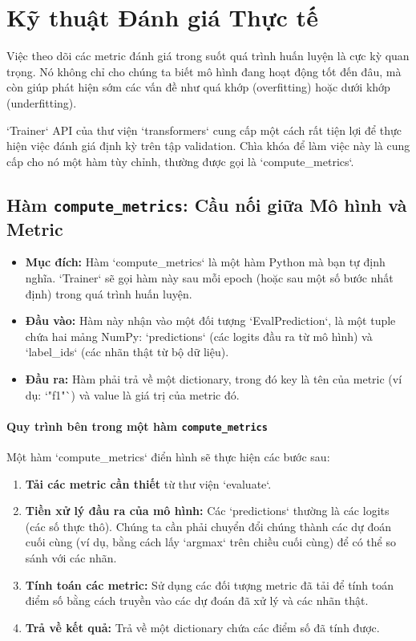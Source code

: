 
\section{Kỹ thuật Đánh giá Thực tế}
\label{sec:practical_evaluation}

Việc theo dõi các metric đánh giá trong suốt quá trình huấn luyện là cực kỳ quan trọng. Nó không chỉ cho chúng ta biết mô hình đang hoạt động tốt đến đâu, mà còn giúp phát hiện sớm các vấn đề như quá khớp (overfitting) hoặc dưới khớp (underfitting).

`Trainer` API của thư viện `transformers` cung cấp một cách rất tiện lợi để thực hiện việc đánh giá định kỳ trên tập validation. Chìa khóa để làm việc này là cung cấp cho nó một hàm tùy chỉnh, thường được gọi là `compute\_metrics`.

\subsection{Hàm \texttt{compute\_metrics}: Cầu nối giữa Mô hình và Metric}
\label{ssec:compute_metrics_function}

\begin{itemize}
    \item \textbf{Mục đích:} Hàm `compute\_metrics` là một hàm Python mà bạn tự định nghĩa. `Trainer` sẽ gọi hàm này sau mỗi epoch (hoặc sau một số bước nhất định) trong quá trình huấn luyện.
    \item \textbf{Đầu vào:} Hàm này nhận vào một đối tượng `EvalPrediction`, là một tuple chứa hai mảng NumPy: `predictions` (các logits đầu ra từ mô hình) và `label\_ids` (các nhãn thật từ bộ dữ liệu).
    \item \textbf{Đầu ra:} Hàm phải trả về một dictionary, trong đó key là tên của metric (ví dụ: `"f1"`) và value là giá trị của metric đó.
\end{itemize}

\paragraph{Quy trình bên trong một hàm \texttt{compute\_metrics}}
Một hàm `compute\_metrics` điển hình sẽ thực hiện các bước sau:
\begin{enumerate}
    \item \textbf{Tải các metric cần thiết} từ thư viện `evaluate`.
    \item \textbf{Tiền xử lý đầu ra của mô hình:} Các `predictions` thường là các logits (các số thực thô). Chúng ta cần phải chuyển đổi chúng thành các dự đoán cuối cùng (ví dụ, bằng cách lấy `argmax` trên chiều cuối cùng) để có thể so sánh với các nhãn.
    \item \textbf{Tính toán các metric:} Sử dụng các đối tượng metric đã tải để tính toán điểm số bằng cách truyền vào các dự đoán đã xử lý và các nhãn thật.
    \item \textbf{Trả về kết quả:} Trả về một dictionary chứa các điểm số đã tính được.
\end{enumerate}

